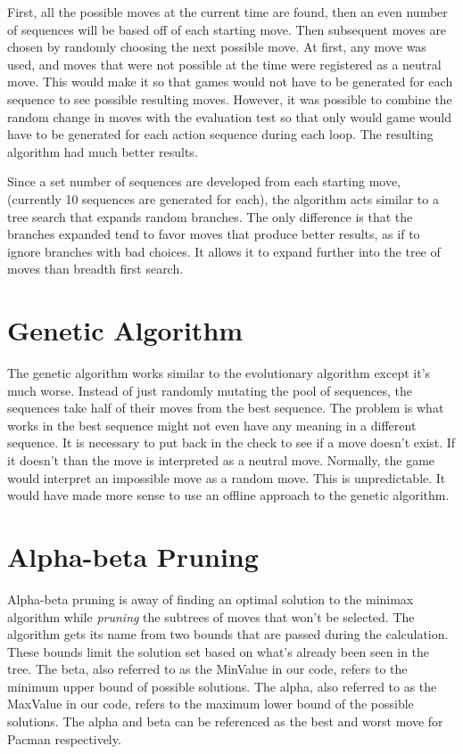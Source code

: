 \documentclass[a4paper,oneside,10pt]{report}
\begin{document}
First, all the possible moves at the current time are found, then an even number of sequences will be based off of each starting move. Then subsequent moves are chosen by randomly choosing the next possible move. At first, any move was used, and moves that were not possible at the time were registered as a neutral move. This would make it so that games would not have to be generated for each sequence to see possible resulting moves. However, it was possible to combine the random change in moves with the evaluation test so that only would game would have to be generated for each action sequence during each loop. The resulting algorithm had much better results.

Since a set number of sequences are developed from each starting move, (currently 10 sequences are generated for each), the algorithm acts similar to a tree search that expands random branches. The only difference is that the branches expanded tend to favor moves that produce better results, as if to ignore branches with bad choices. It allows it to expand further into the tree of moves than breadth first search.

\section{Genetic Algorithm}\label{genetic}

The genetic algorithm works similar to the evolutionary algorithm except it's much worse. Instead of just randomly mutating the pool of sequences, the sequences take half of their moves from the best sequence. The problem is what works in the best sequence might not even have any meaning in a different sequence. It is necessary to put back in the check to see if a move doesn't exist. If it doesn't than the move is interpreted as a neutral move. Normally, the game would interpret an impossible move as a random move. This is unpredictable. It would have made more sense to use an offline approach to the genetic algorithm.

\section{Alpha-beta Pruning}\label{alphabeta}

Alpha-beta pruning is away of finding an optimal solution to the minimax algorithm while \textit{pruning} the subtrees of moves that won't be selected. The algorithm gets its name from two bounds that are passed during the calculation. These bounds limit the solution set based on what's already been seen in the tree. The beta, also referred to as the MinValue in our code, refers to the minimum upper bound of possible solutions. The alpha, also referred to as the MaxValue in our code, refers to the maximum lower bound of the possible solutions. The alpha and beta can be referenced as the best and worst move for Pacman respectively. 
\end{document}
